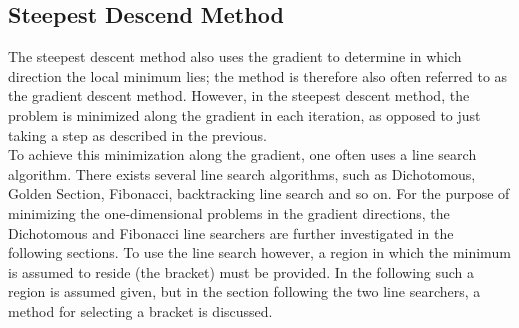 \subsection{Steepest Descend Method}
The steepest descent method also uses the gradient to determine in which direction the local minimum lies; the method is therefore also often referred to as the gradient descent method. However, in the steepest descent method, the problem is minimized along the gradient in each iteration, as opposed to just taking a step as described in the previous.\\
To achieve this minimization along the gradient, one often uses a line search algorithm. There exists several line search algorithms, such as Dichotomous, Golden Section, Fibonacci, backtracking line search and so on. For the purpose of minimizing the one-dimensional problems in the gradient directions, the Dichotomous and Fibonacci line searchers are further investigated in the following sections. To use the line search however, a region in which the minimum is assumed to reside (the bracket) must be provided. In the following such a region is assumed given, but in the section following the two line searchers, a method for selecting a bracket is discussed.

